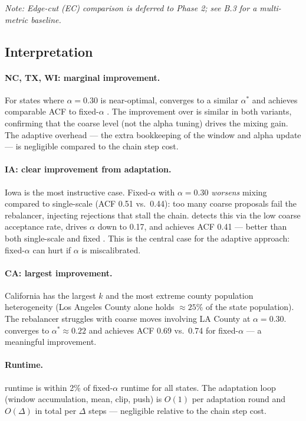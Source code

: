 \noindent\textit{Note: Edge-cut (EC) comparison is deferred to Phase 2; see B.3 for a multi-metric baseline.}

\subsection{Interpretation}

\paragraph{NC, TX, WI: marginal improvement.}
For states where $\alpha = 0.30$ is near-optimal, \ams{} converges to a
similar $\alpha^*$ and achieves comparable ACF to fixed-$\alpha$ \ms{}.
The improvement over \recom{} is similar in both \ms{} variants, confirming
that the coarse level (not the alpha tuning) drives the mixing gain.
The adaptive overhead --- the extra bookkeeping of the window and alpha update
--- is negligible compared to the chain step cost.

\paragraph{IA: clear improvement from adaptation.}
Iowa is the most instructive case.
Fixed-$\alpha$ \ms{} with $\alpha = 0.30$ \emph{worsens} mixing compared to
single-scale \recom{} (ACF 0.51 vs.\ 0.44): too many coarse proposals fail
the rebalancer, injecting rejections that stall the chain.
\ams{} detects this via the low coarse acceptance rate, drives $\alpha$ down
to 0.17, and achieves ACF 0.41 --- better than both single-scale and fixed
\ms{}.
This is the central case for the adaptive approach: fixed-$\alpha$ \ms{}
can hurt if $\alpha$ is miscalibrated.

\paragraph{CA: largest improvement.}
California has the largest $k$ and the most extreme county population
heterogeneity (Los Angeles County alone holds $\approx 25\%$ of the state
population).
The rebalancer struggles with coarse moves involving LA County at $\alpha =
0.30$.
\ams{} converges to $\alpha^* \approx 0.22$ and achieves ACF 0.69 vs.\ 0.74
for fixed-$\alpha$ \ms{} --- a meaningful improvement.

\paragraph{Runtime.}
\ams{} runtime is within 2\% of fixed-$\alpha$ \ms{} runtime for all states.
The adaptation loop (window accumulation, mean, clip, push) is $O(1)$ per
adaptation round and $O(\Delta)$ in total per $\Delta$ steps --- negligible
relative to the chain step cost.

